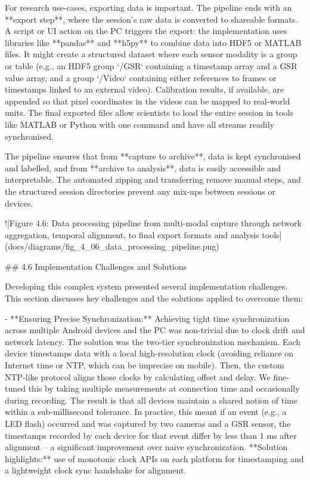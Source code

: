 \documentclass[12pt,a4paper]{article}
\begin{document}
{For research use-cases, exporting data is important. The pipeline ends
with an **export step**, where the session's raw data is converted to
shareable formats. A script or UI action on the PC triggers the export:
the implementation uses libraries like **pandas** and **h5py** to
combine data into HDF5 or MATLAB files. It might create a structured
dataset where each sensor modality is a group or table (e.g., an HDF5
group `/GSR` containing a timestamp array and a GSR value array, and a
group `/Video` containing either references to frames or timestamps
linked to an external video). Calibration results, if available, are
appended so that pixel coordinates in the videos can be mapped to
real-world units. The final exported files allow scientists to load the
entire session in tools like MATLAB or Python with one command and have
all streams readily synchronised.

The pipeline ensures that from **capture to archive**, data
is kept synchronised and labelled, and from **archive to analysis**, data
is easily accessible and interpretable. The automated zipping and
transferring remove manual steps, and the structured session directories
prevent any mix-ups between sessions or devices.

![Figure 4.6: Data processing pipeline from multi-modal capture through network aggregation, temporal alignment, to final export formats and analysis tools](docs/diagrams/fig_4_06_data_processing_pipeline.png)

## 4.6 Implementation Challenges and Solutions

Developing this complex system presented several implementation
challenges. This section discusses key challenges and the solutions
applied to overcome them:

- **Ensuring Precise Synchronization:** Achieving tight time
  synchronization across multiple Android devices and the PC was
  non-trivial due to clock drift and network latency. The solution was
  the two-tier synchronization mechanism. Each device timestamps data
  with a local high-resolution clock (avoiding reliance on Internet time
  or NTP, which can be imprecise on mobile). Then, the custom NTP-like
  protocol aligns those clocks by calculating offset and delay. We
  fine-tuned this by taking multiple measurements at connection time and
  occasionally during recording. The result is that all devices maintain
  a shared notion of time within a sub-millisecond tolerance. In
  practice, this meant if an event (e.g., a LED flash) occurred and was
  captured by two cameras and a GSR sensor, the timestamps recorded by
  each device for that event differ by less than 1 ms after alignment --
  a significant improvement over naive synchronization. **Solution
  highlights:** use of monotonic clock APIs on each platform for
  timestamping and a lightweight clock sync handshake for alignment.

}
\end{document}
